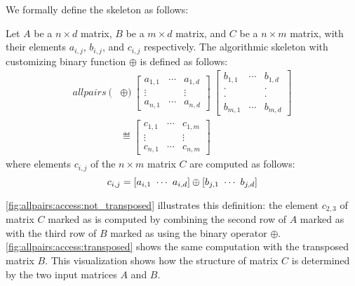 We formally define the \allpairs skeleton as follows:

\begin{definition}
  \label{def:allpairs}
  Let $A$ be a $n\times d$ matrix, $B$ be a $m\times d$ matrix, and $C$ be a $n\times m$ matrix, with their elements $a_{i,j}$, $b_{i,j}$, and $c_{i,j}$ respectively.
  The algorithmic skeleton \allpairs with customizing binary function $\oplus$ is defined as follows:
  \begin{equation*}
    \begin{split}
    allpairs\ (&\oplus)\
      \left[ \begin{array}{ccc} a_{1,1} & \cdots & a_{1,d}\\[.25em] \vdots & & \vdots\\[.25em] a_{n,1} & \cdots & a_{n,d} \end{array}\right]\ %
      \left[ \begin{array}{ccc} b_{1,1} & \cdots & b_{1,d}\\[-.25em] \cdot & & \cdot\\[-.75em] \cdot & & \cdot\\[-.25em] b_{m,1} & \cdots & b_{m,d} \end{array}\right]%
      \\
    &\eqdef \left[ \begin{array}{ccc} c_{1,1} & \cdots & c_{1,m}\\[.25em] \vdots & & \vdots\\[.25em] c_{n,1} & \cdots & c_{n,m} \end{array} \right]
    \end{split}
  \end{equation*}
  where elements $c_{i,j}$ of the $n\times m$ matrix $C$ are computed as follows:
  \[
    c_{i,j} = \left[a_{i,1}\ \cdots\ a_{i,d}\right] \oplus \left[b_{j,1}\ \cdots\ b_{j,d}\right]
  \]
\end{definition}

\autoref{fig:allpairs:access:not_transposed} illustrates this definition:
the element $c_{2,3}$ of matrix $C$ marked as \circled{3} is computed by combining the second row of $A$ marked as  with the third row of $B$ marked as  using the binary operator $\oplus$.
\autoref{fig:allpairs:access:transposed} shows the same computation with the transposed matrix $B$.
This visualization shows how the structure of matrix $C$ is determined by the two input matrices $A$ and $B$.

